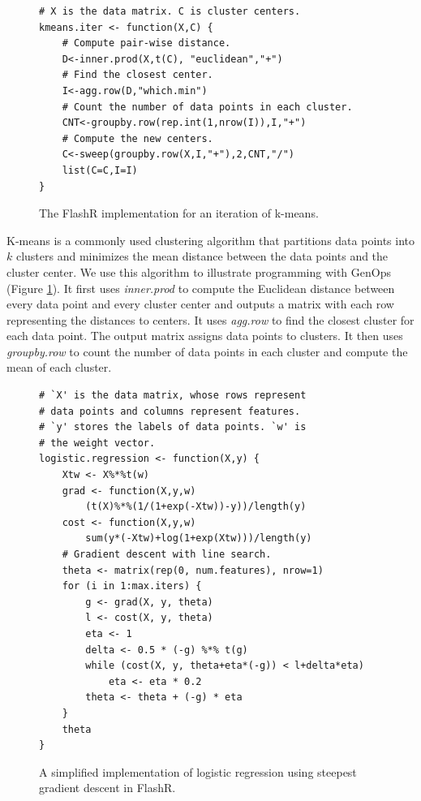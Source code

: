 \begin{figure}
\centering
\begin{verbatim}
# X is the data matrix. C is cluster centers.
kmeans.iter <- function(X,C) {
	# Compute pair-wise distance.
	D<-inner.prod(X,t(C), "euclidean","+")
	# Find the closest center.
	I<-agg.row(D,"which.min")
	# Count the number of data points in each cluster.
	CNT<-groupby.row(rep.int(1,nrow(I)),I,"+")
	# Compute the new centers.
	C<-sweep(groupby.row(X,I,"+"),2,CNT,"/")
	list(C=C,I=I)
}
\end{verbatim}
\vspace{-10pt}
	\caption{The FlashR implementation for an iteration of k-means.}
	\label{fig:kmeans}
\vspace{-10pt}
\end{figure}

K-means is a commonly used clustering algorithm that partitions data points
into $k$ clusters and minimizes the mean distance between
the data points and the cluster center. We use this algorithm
to illustrate programming with GenOps (Figure \ref{fig:kmeans}).
It first uses \textit{inner.prod} to
compute the Euclidean distance between every data point and every cluster center
and outputs a matrix with each row representing the distances to centers.  
It uses \textit{agg.row} to find the closest
cluster for each data point.  The output matrix 
assigns data points to clusters. It then uses \textit{groupby.row} to count
the number of data points in each cluster and compute the mean of each cluster.

\begin{figure}
\begin{verbatim}
# `X' is the data matrix, whose rows represent
# data points and columns represent features.
# `y' stores the labels of data points. `w' is
# the weight vector.
logistic.regression <- function(X,y) {
	Xtw <- X%*%t(w)
	grad <- function(X,y,w)
		(t(X)%*%(1/(1+exp(-Xtw))-y))/length(y)
	cost <- function(X,y,w)
		sum(y*(-Xtw)+log(1+exp(Xtw)))/length(y)
	# Gradient descent with line search.
	theta <- matrix(rep(0, num.features), nrow=1)
	for (i in 1:max.iters) {
		g <- grad(X, y, theta)
		l <- cost(X, y, theta)
		eta <- 1
		delta <- 0.5 * (-g) %*% t(g)
		while (cost(X, y, theta+eta*(-g)) < l+delta*eta)
			eta <- eta * 0.2
		theta <- theta + (-g) * eta
	}
	theta
}
\end{verbatim}
\vspace{-10pt}
\caption{A simplified implementation of logistic regression using
steepest gradient descent in FlashR.}
\label{logistic}
\vspace{-5pt}
\end{figure}

